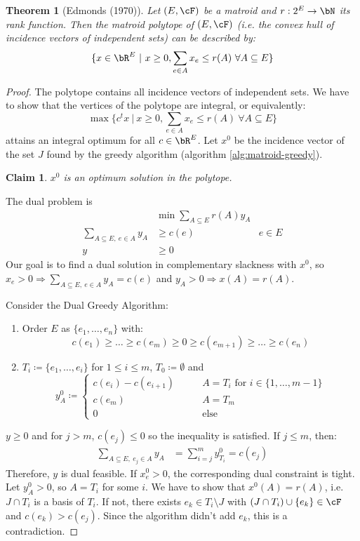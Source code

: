 \documentclass[11pt, a4paper]{article}
\newcommand{\set}[1]{\{#1\}}
\newtheorem{theorem}{Theorem}[section]
\newtheorem*{claim}{Claim}
\theoremstyle{remark}
\theoremstyle{definition}
\begin{document}
\begin{theorem}[Edmonds (1970)]\label{thm:matroid-polytope}
	Let $(E,\cF)$ be a matroid and $r: 2^E\to\bN$ its rank function. Then
	the \emph{matroid polytope} of $(E,\cF)$ (i.e. the convex hull of
	incidence vectors of independent sets) can be described by:
	\[\set{x\in \bR^E\ |\ x\geq0, \sum_{e\in A}x_e\leq r(A)\ \forall A\subseteq E}\]
\end{theorem}
\begin{proof}
	The polytope contains all incidence vectors of independent sets. We have
	to show that the vertices of the polytope are integral, or equivalently:
	\[\max\set{c^tx\ |\ x\geq0, \sum_{e\in A}x_e\leq r(A)\ \forall A\subseteq E}\]
	attains an integral optimum for all $c\in\bR^E$. Let $x^0$ be the
	incidence vector of the set $J$ found by the greedy algorithm
	(algorithm \ref{alg:matroid-greedy}).
	\begin{claim}
		$x^0$ is an optimum solution in the polytope.
	\end{claim}
	The dual problem is
	\begin{align*}
		                                & \min \sum_{A\subseteq E}r(A)y_A          \\
		\sum_{A\subseteq E,\ e\in A}y_A & \geq c(e)                       & e\in E \\
		y                               & \geq0
	\end{align*}
	Our goal is to find a dual solution in complementary slackness with $x^0$,
	so $x_e>0 \Rightarrow \sum_{A\subseteq E,\ e\in A}y_A=c(e)$ and
	$y_A>0 \Rightarrow x(A)=r(A)$.

	Consider the Dual Greedy Algorithm:
	\begin{enumerate}
		\item Order $E$ as $\set{e_1,\ldots,e_n}$ with:
		\[c(e_1)\geq \ldots \geq c(e_m)\geq 0\geq c(e_{m+1})\geq \ldots\geq c(e_n)\]
		\item $T_i\coloneqq \set{e_1,\ldots,e_i}$ for $1\leq i\leq m$,
		$T_0\coloneqq\emptyset$ and
		\[y_A^0\coloneqq\begin{cases}
				c(e_i)-c(e_{i+1}) \qquad & A=T_i \text{ for $i\in\set{1,\ldots,m-1}$} \\
				c(e_m) \qquad            & A=T_m                                      \\
				0 \qquad                 & \text{else}
			\end{cases}\]
	\end{enumerate}
	$y\geq0$ and for $j>m$, $c(e_j)\leq 0$ so the inequality is satisfied.
	If $j\leq m$, then:
	\begin{align*}
		\sum_{A\subseteq E,\ e_j\in A}y_A & =\sum_{i=j}^m y^0_{T_i}=c(e_j)
	\end{align*}
	Therefore, $y$ is dual feasible. If $x^0_e>0$, the corresponding dual
	constraint is tight. Let $y^0_A>0$, so $A=T_i$ for some $i$. We
	have to show that $x^0(A)=r(A)$, i.e. $J\cap T_i$ is a basis of $T_i$.
	If not, there exists $e_k\in T_i\setminus J$ with $(J\cap T_i)\cup\set{e_k}
		\in \cF$ and $c(e_k)>c(e_j)$. Since the algorithm didn't add $e_k$,
	this is a contradiction.
\end{proof}
\end{document}
